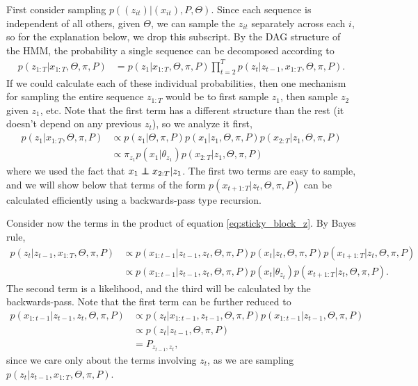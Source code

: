 \documentclass[14pt]{extarticle}
\begin{document}
First consider sampling $p\left(\left(z_{it}\right) \vert \left(x_{it}\right),
P, \Theta\right)$. Since each sequence is independent of all others, given
$\Theta$, we can sample the $z_{it}$ separately across each $i$, so for the
explanation below, we drop this subscript. By the DAG structure of the HMM, the
probability a single sequence can be decomposed according to
\begin{align}
  \label{eq:sticky_block_z}
  p\left(z_{1:T} \vert x_{1:T}, \Theta, \pi, P\right) &= p\left(z_{1} \vert x_{1:T}, \Theta, \pi, P\right) \prod_{t = 2}^{T} p\left(z_{t} \vert z_{t - 1}, x_{1:T}, \Theta, \pi, P\right).
\end{align}
If we could calculate each of these individual probabilities, then one mechanism
for sampling the entire sequence $z_{1:T}$ would be to first sample $z_{1}$,
then sample $z_{2}$ given $z_{1}$, etc. Note that the first term has a different
structure than the rest (it doesn't depend on any previous $z_{t}$), so we
analyze it first,
\begin{align*}
  p\left(z_{1} \vert x_{1:T}, \Theta, \pi, P\right) &\propto p\left(z_{1} \vert \Theta, \pi, P\right) p\left(x_{1} \vert z_{1}, \Theta, \pi, P\right) p\left(x_{2:T} \vert z_{1}, \Theta, \pi, P\right) \\
  &\propto \pi_{z_{1}} p\left(x_{1} \vert \theta_{z_{1}}\right) p\left(x_{2:T} \vert z_{1}, \Theta, \pi, P\right)
\end{align*}
where we used the fact that $x_{1} \independent x_{2:T} \vert z_{1}$. The first
two terms are easy to sample, and we will show below that terms of the form
$p\left(x_{t + 1:T} \vert z_{t}, \Theta, \pi, P\right)$ can be calculated
efficiently using a backwards-pass type recursion.

Consider now the terms in the product of equation \ref{eq:sticky_block_z}. By
Bayes rule,
\begin{align*}
  p\left(z_{t} \vert z_{t - 1}, x_{1:T}, \Theta, \pi, P\right) &\propto p\left(x_{1:t - 1} \vert z_{t - 1}, z_{t}, \Theta, \pi, P\right)
  p\left(x_{t} \vert z_{t}, \Theta, \pi, P\right)
  p\left(x_{t + 1 : T} \vert z_{t}, \Theta, \pi, P\right) \\
  &\propto p\left(x_{1:t - 1} \vert z_{t - 1}, z_t, \Theta, \pi, P\right) p\left(x_t \vert \theta_{z_t}\right) p\left(x_{t + 1 : T}\vert z_{t}, \Theta, \pi, P\right).
\end{align*}
The second term is a likelihood, and the third will be calculated by the
backwards-pass. Note that the first term can be further reduced to
\begin{align*}
  p\left(x_{1:t - 1} \vert z_{t - 1}, z_t, \Theta, \pi, P\right) &\propto p\left(z_{t} \vert x_{1:t - 1}, z_{t - 1}, \Theta, \pi, P\right)p\left(x_{1:t - 1} \vert z_{t - 1}, \Theta, \pi, P\right) \\
  &\propto p\left(z_{t} \vert z_{t - 1}, \Theta, \pi, P\right) \\
  &= P_{z_{t - 1}, z_{t}},
\end{align*}
since we care only about the terms involving $z_{t}$, as we are sampling
$p\left(z_{t} \vert z_{t - 1}, x_{1:T}, \Theta, \pi, P\right)$.
\end{document}

